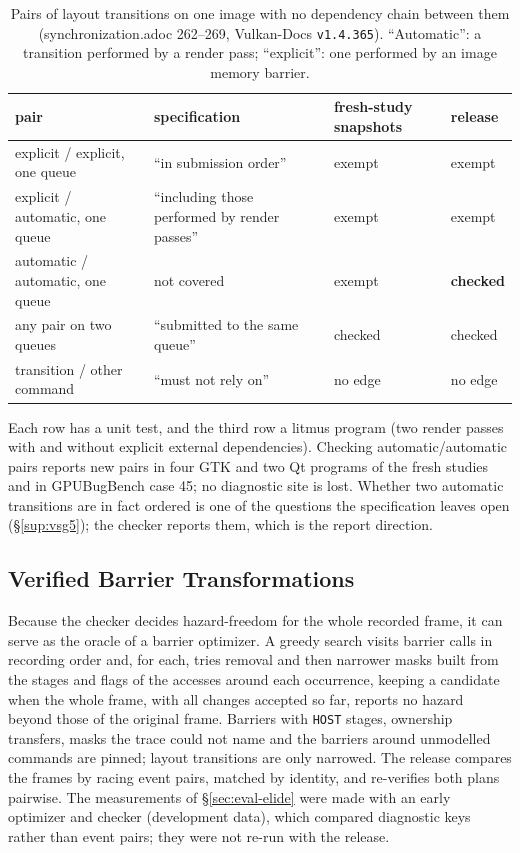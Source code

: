 \documentclass[acmtog,anonymous,review]{acmart}
\newcommand{\bench}{GPUBugBench\xspace}
\newcommand{\code}[1]{\texttt{#1}}
\begin{document}
\begin{table}[h]
\caption{Pairs of layout transitions on one image with no dependency chain between them (synchronization.adoc
262--269, Vulkan-Docs \code{v1.4.365}). ``Automatic'': a transition performed by a render pass; ``explicit'': one
performed by an image memory barrier.}
\label{tab:s-ltmatrix}
\scriptsize
\begin{tabular}{@{}p{2.9cm}p{2.5cm}p{1.1cm}l@{}}
\toprule
pair & specification & fresh-study snapshots & release \\
\midrule
explicit / explicit, one queue & ``in submission order'' & exempt & exempt \\
explicit / automatic, one queue & ``including those performed by render passes'' & exempt & exempt \\
automatic / automatic, one queue & not covered & exempt & \textbf{checked} \\
any pair on two queues & ``submitted to the same queue'' & checked & checked \\
transition / other command & ``must not rely on'' & no edge & no edge \\
\bottomrule
\end{tabular}
\end{table}
Each row has a unit test, and the third row a litmus program (two render passes with and without explicit external
dependencies). Checking automatic/automatic pairs reports new pairs in four GTK and two Qt programs of the fresh
studies and in \bench case 45; no diagnostic site is lost. Whether two automatic transitions are in fact ordered is
one of the questions the specification leaves open (\S\ref{sup:vsg5}); the checker reports them, which is the report
direction.

\subsection{Verified Barrier Transformations}
\label{sec:elide}
Because the checker decides hazard-freedom for the whole recorded frame, it can serve as the oracle of a barrier
optimizer. A greedy search visits barrier calls in recording order and, for each, tries removal and then narrower
masks built from the stages and flags of the accesses around each occurrence, keeping a candidate when the whole
frame, with all changes accepted so far, reports no hazard beyond those of the original frame. Barriers with
\code{HOST} stages, ownership transfers, masks the trace could not name and the barriers around unmodelled commands are
pinned; layout transitions are only narrowed. The release compares the frames by racing event pairs, matched by
identity, and re-verifies both plans pairwise. The measurements of \S\ref{sec:eval-elide} were made with an early
optimizer and checker (development data), which compared diagnostic keys rather than event pairs; they were not
re-run with the release.
\end{document}
